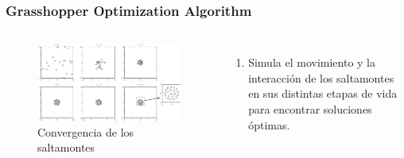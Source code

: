 \begin{frame}
  \frametitle{Grasshopper Optimization Algorithm}
  \begin{columns}
    \begin{figure}
      \begin{center}
        \includegraphics[width=\textwidth]{imagenes/chapter3/goa-position-convergence.png}
      \end{center}
      \caption{Convergencia de los saltamontes \footnotemark[5]}
    \end{figure}
    \begin{enumerate}
      \item Simula el movimiento y la interacción de los saltamontes en sus distintas etapas de vida para encontrar soluciones óptimas.
    \end{enumerate}
  \end{columns}
\end{frame}

